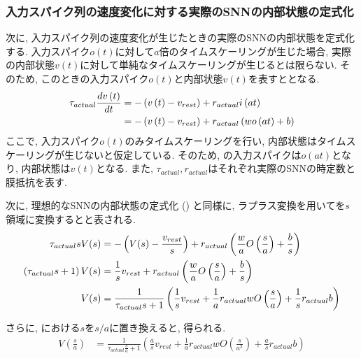 \subsubsection{入力スパイク列の速度変化に対する実際のSNNの内部状態の定式化}
次に, 入力スパイク列の速度変化が生じたときの実際のSNNの内部状態を定式化する.
入力スパイク$o(t)$に対して$a$倍のタイムスケーリングが生じた場合, 実際の内部状態$v(t)$に対して単純なタイムスケーリングが生じるとは限らない.
そのため, このときの入力スパイク$o(t)$と内部状態$v(t)$を表すととなる.
\begin{align}
    \tau_{actual} \frac{dv\left(t\right)}{dt} &= -\left(v\left(t\right) - v_{rest}\right) + r_{actual} i\left(at\right) \notag \\
     &= -\left(v\left(t\right) - v_{rest}\right) + r_{actual} \left( wo\left(at\right) + b \right) \label{eq:actual:state}
\end{align}
ここで, 入力スパイク$o(t)$のみタイムスケーリングを行い, 内部状態はタイムスケーリングが生じないと仮定している.
そのため, の入力スパイクは$o(at)$となり, 内部状態は$v(t)$となる.
また, $\tau_{actual}, r_{actual}$はそれぞれ実際のSNNの時定数と膜抵抗を表す.

次に, 理想的なSNNの内部状態の定式化 () と同様に, ラプラス変換を用いてを$s$領域に変換するとと表される.
\begin{align}
    \tau_{actual} sV(s) &= - \left( V(s) - \frac{v_{rest}}{s} \right) + r_{actual} \left( \frac{w}{a} O\left(\frac{s}{a}\right) + \frac{b}{s} \right) \notag \\
    \left(\tau_{actual} s +1\right) V(s) &= \frac{1}{s} v_{rest} +r_{actual} \left( \frac{w}{a} O\left(\frac{s}{a}\right) + \frac{b}{s} \right) \notag \\
    V(s) &=  \frac{1}{\tau_{actual} s +1}\left( \frac{1}{s} v_{rest} +\frac{1}{a} r_{actual} w O\left(\frac{s}{a}\right) + \frac{1}{s} r_{actual} b \right) \label{eq:actual:state:laplace}
\end{align}

さらに, における$s$を$s/a$に置き換えると, 得られる.
\begin{align}
    V\left(\frac{s}{a}\right) &=  \frac{1}{\tau_{actual} \frac{s}{a} +1}\left( \frac{a}{s} v_{rest} +\frac{1}{a} r_{actual} w O\left(\frac{s}{a^2}\right) + \frac{a}{s} r_{actual} b \right) \label{eq:actual:state:laplace2}
\end{align}


